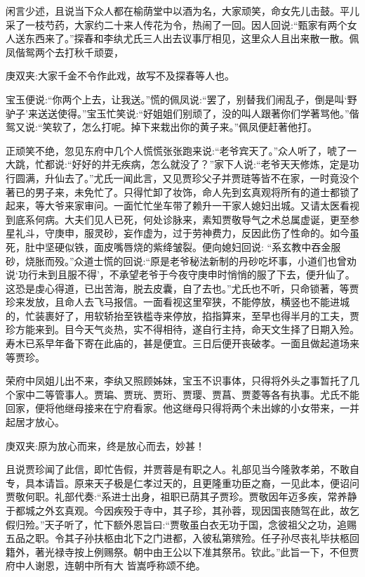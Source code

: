 \begin{parag}
    闲言少述，且说当下众人都在榆荫堂中以酒为名，大家顽笑，命女先儿击鼓。平儿采了一枝芍药，大家约二十来人传花为令，热闹了一回。因人回说:“甄家有两个女人送东西来了。”探春和李纨尤氏三人出去议事厅相见，这里众人且出来散一散。佩凤偕鸳两个去打秋千顽耍，\begin{note}庚双夹:大家千金不令作此戏，故写不及探春等人也。\end{note}宝玉便说:“你两个上去，让我送。”慌的佩凤说:“罢了，别替我们闹乱子，倒是叫‘野驴子’来送送使得。”宝玉忙笑说:“好姐姐们别顽了，没的叫人跟著你们学著骂他。”偕鸳又说:“笑软了，怎么打呢。掉下来栽出你的黄子来。”佩凤便赶著他打。
\end{parag}


\begin{parag}
    正顽笑不绝，忽见东府中几个人慌慌张张跑来说:“老爷宾天了。”众人听了，唬了一大跳，忙都说:“好好的并无疾病，怎么就没了？”家下人说:“老爷天天修炼，定是功行圆满，升仙去了。”尤氏一闻此言，又见贾珍父子并贾琏等皆不在家，一时竟没个著已的男子来，未免忙了。只得忙卸了妆饰，命人先到玄真观将所有的道士都锁了起来，等大爷来家审问。一面忙忙坐车带了赖升一干家人媳妇出城。又请太医看视到底系何病。大夫们见人已死，何处诊脉来，素知贾敬导气之术总属虚诞，更至参星礼斗，守庚申，服灵砂，妄作虚为，过于劳神费力，反因此伤了性命的。如今虽死，肚中坚硬似铁，面皮嘴唇烧的紫绛皱裂。便向媳妇回说: “系玄教中吞金服砂，烧胀而殁。”众道士慌的回说:“原是老爷秘法新制的丹砂吃坏事，小道们也曾劝说‘功行未到且服不得’，不承望老爷于今夜守庚申时悄悄的服了下去，便升仙了。这恐是虔心得道，已出苦海，脱去皮囊，自了去也。”尤氏也不听，只命锁著，等贾珍来发放，且命人去飞马报信。一面看视这里窄狭，不能停放，横竖也不能进城的，忙装裹好了，用软轿抬至铁槛寺来停放，掐指算来，至早也得半月的工夫，贾珍方能来到。目今天气炎热，实不得相待，遂自行主持，命天文生择了日期入殓。寿木已系早年备下寄在此庙的，甚是便宜。三日后便开丧破孝。一面且做起道场来等贾珍。
\end{parag}


\begin{parag}
    荣府中凤姐儿出不来，李纨又照顾姊妹，宝玉不识事体，只得将外头之事暂托了几个家中二等管事人。贾㻞、贾珖、贾珩、贾璎、贾菖、贾菱等各有执事。尤氏不能回家，便将他继母接来在宁府看家。他这继母只得将两个未出嫁的小女带来，一并起居才放心。\begin{note}庚双夹:原为放心而来，终是放心而去，妙甚！\end{note}
\end{parag}


\begin{parag}
    且说贾珍闻了此信，即忙告假，并贾蓉是有职之人。礼部见当今隆敦孝弟，不敢自专，具本请旨。原来天子极是仁孝过天的，且更隆重功臣之裔，一见此本，便诏问贾敬何职。礼部代奏:“系进士出身，祖职已荫其子贾珍。贾敬因年迈多疾，常养静于都城之外玄真观。今因疾殁于寺中，其子珍，其孙蓉，现因国丧随驾在此，故乞假归殓。”天子听了，忙下额外恩旨曰:“贾敬虽白衣无功于国，念彼祖父之功，追赐五品之职。令其子孙扶柩由北下之门进都，入彼私第殡殓。任子孙尽丧礼毕扶柩回籍外，著光禄寺按上例赐祭。朝中由王公以下准其祭吊。钦此。”此旨一下，不但贾府中人谢恩，连朝中所有大 皆嵩呼称颂不绝。
\end{parag}


